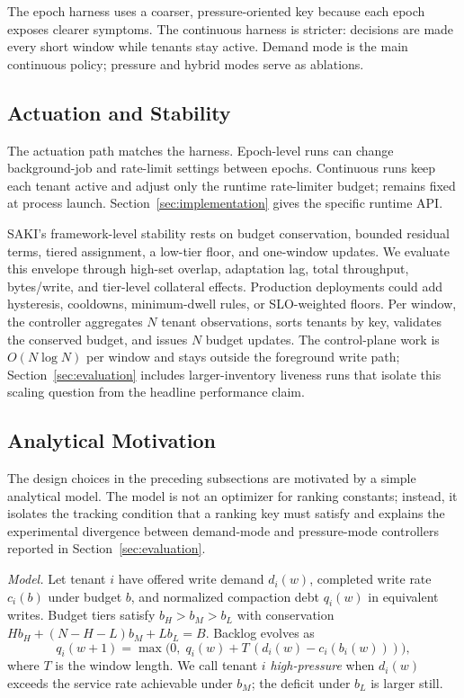 The epoch harness uses a coarser, pressure-oriented key because each epoch
exposes clearer symptoms. The continuous harness is stricter: decisions are made
every short window while tenants stay active. Demand mode is the main
continuous policy; pressure and hybrid modes serve as ablations.

\subsection{Actuation and Stability}

The actuation path matches the harness. Epoch-level runs can change
background-job and rate-limit settings between epochs. Continuous runs keep
each tenant active and adjust only the runtime rate-limiter budget; \maxbgjobs
remains fixed at process launch. Section~\ref{sec:implementation} gives the
specific runtime API.

SAKI's framework-level stability rests on budget conservation, bounded residual
terms, tiered assignment, a low-tier floor, and one-window updates. We evaluate
this envelope through high-set overlap, adaptation lag, total throughput,
bytes/write, and tier-level collateral effects. Production deployments could
add hysteresis, cooldowns, minimum-dwell rules, or SLO-weighted floors.
Per window, the controller aggregates \(N\) tenant observations, sorts tenants
by key, validates the conserved budget, and issues \(N\) budget updates. The
control-plane work is \(O(N\log N)\) per window and stays outside the foreground
write path; Section~\ref{sec:evaluation} includes larger-inventory liveness
runs that isolate this scaling question from the headline performance claim.

\subsection{Analytical Motivation}
\label{sec:analysis}

The design choices in the preceding subsections are motivated by a simple
analytical model. The model is not an optimizer for ranking constants; instead,
it isolates the tracking condition that a ranking key must satisfy and
explains the experimental divergence between demand-mode and pressure-mode
controllers reported in Section~\ref{sec:evaluation}.

\emph{Model.}
Let tenant \(i\) have offered write demand \(d_i(w)\), completed write rate
\(c_i(b)\) under budget \(b\), and normalized compaction debt \(q_i(w)\) in
equivalent writes. Budget tiers satisfy \(b_H>b_M>b_L\) with conservation
\(H b_H+(N-H-L)b_M+L b_L=B\). Backlog evolves as
\[
q_i(w+1)=\max\!\bigl(0,\; q_i(w)+T\,(d_i(w)-c_i(b_i(w)))\bigr),
\]
where \(T\) is the window length. We call tenant \(i\) \emph{high-pressure}
when \(d_i(w)\) exceeds the service rate achievable under \(b_M\); the deficit
under \(b_L\) is larger still.

